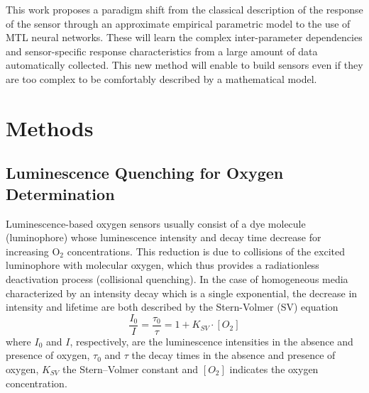\documentclass[9pt,twocolumn,twoside,pdftex]{optica}
\begin{document}
This work proposes a paradigm shift from the classical description of the response of the sensor through an approximate empirical parametric model to the use of MTL neural networks. 
These will learn the complex inter-parameter dependencies and sensor-specific response characteristics from a large amount of data automatically collected. This new method will enable to build sensors even if they are too complex to be comfortably described by a mathematical model.




\section{Methods}
\label{sec:methods}

\subsection{Luminescence Quenching for Oxygen Determination}
\label{Theory}

Luminescence-based oxygen sensors usually consist of a dye molecule (luminophore) whose luminescence intensity and decay time decrease for increasing O$_2$ concentrations. This reduction is due to collisions of the excited luminophore with molecular oxygen, which thus provides a radiationless deactivation process (collisional quenching). 
In the case of homogeneous media characterized by an intensity decay which is a single exponential, the decrease in intensity and lifetime are both described by the Stern-Volmer (SV) equation \cite{Lakowicz2006}
\begin{equation}
\frac{I_0}{I}=\frac{\tau_0}{\tau}=1+K_{SV} \cdot \left[O_2\right]
\label{SVe}
\end{equation}
where $I_0$ and $I$, respectively, are the luminescence intensities in the absence and presence of oxygen, $\tau_0$ and $\tau$ the decay times in the absence and presence of oxygen, $K_{SV}$ the Stern–Volmer constant and $\left[O_2\right]$ indicates the oxygen concentration.
\end{document}

